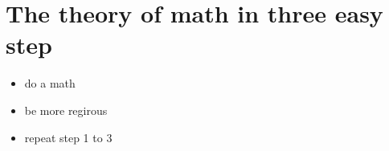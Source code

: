



\section*{The theory of math in three easy step}

\begin{itemize}
	\item do a math
	\item be more regirous
	\item repeat step 1 to 3
\end{itemize}




